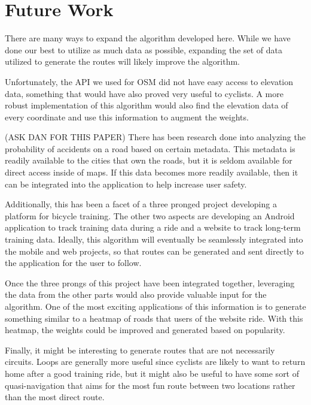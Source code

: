 \documentclass[twocolumn,11pt]{article}
\begin{document}
\section{Future Work}

There are many ways to expand the algorithm developed here. While we have done
our best to utilize as much data as possible, expanding the set of data utilized
to generate the routes will likely improve the algorithm.

Unfortunately, the API we used for OSM did not have easy access to elevation
data, something that would have also proved very useful to cyclists. A more
robust implementation of this algorithm would also find the elevation data of
every coordinate and use this information to augment the weights.

 (ASK DAN FOR THIS
PAPER) There has been research done into analyzing the probability of accidents
on a road based on certain metadata. This metadata is readily available to the
cities that own the roads, but it is seldom available for direct access inside
of maps. If this data becomes more readily available, then it can be integrated
into the application to help increase user safety.

Additionally, this has been a facet of a three pronged project developing a
platform for bicycle training. The other two aspects are developing an Android
application to track training data during a ride and a website to track
long-term training data. Ideally, this algorithm will eventually be seamlessly
integrated into the mobile and web projects, so that routes can be generated
and sent directly to the application for the user to follow.

Once the three prongs of this project have been integrated together, leveraging
the data from the other parts would also provide valuable input for the
algorithm. One of the most exciting applications of this information is to
generate something similar to a heatmap of roads that users of the website
ride. With this heatmap, the weights could be improved and generated based on
popularity.

Finally, it might be interesting to generate routes that are not necessarily
circuits. Loops are generally more useful since cyclists are likely to want
to return home after a good training ride, but it might also be useful to
have some sort of quasi-navigation that aims for the most fun route
between two locations rather than the most direct route.
\end{document}
